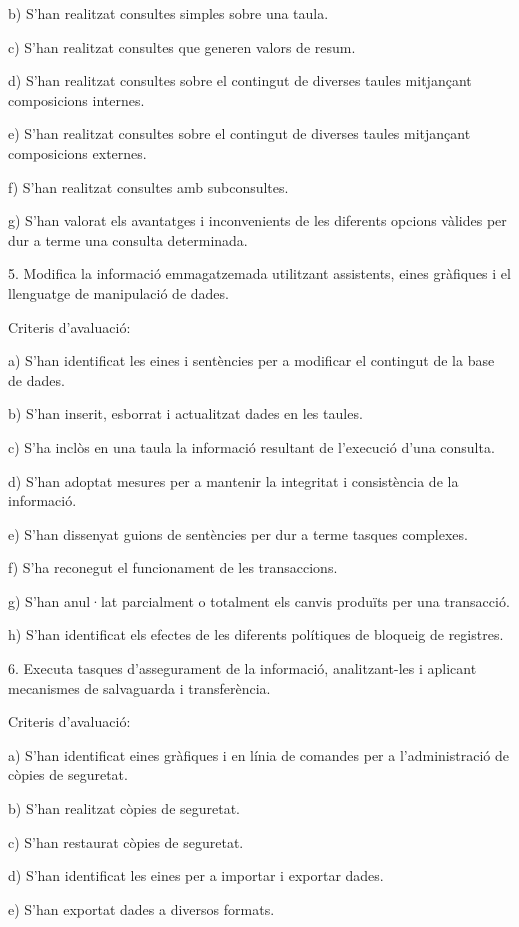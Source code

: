 \documentclass[catalan, a4paper, 12pt, titlepage]{article}
\begin{document}
b) S'han realitzat consultes simples sobre una taula.

c) S'han realitzat consultes que generen valors de resum.

d) S'han realitzat consultes sobre el contingut de diverses taules mitjançant composicions internes.

e) S'han realitzat consultes sobre el contingut de diverses taules mitjançant composicions externes.

f) S'han realitzat consultes amb subconsultes.

g) S'han valorat els avantatges i inconvenients de les diferents opcions vàlides per dur a terme una consulta determinada.

5. Modifica la informació emmagatzemada utilitzant assistents, eines gràfiques i el llenguatge de manipulació de dades.

Criteris d'avaluació:

a) S'han identificat les eines i sentències per a modificar el contingut de la base de dades.

b) S'han inserit, esborrat i actualitzat dades en les taules.

c) S'ha inclòs en una taula la informació resultant de l'execució d'una consulta.

d) S'han adoptat mesures per a mantenir la integritat i consistència de la informació.

e) S'han dissenyat guions de sentències per dur a terme tasques complexes.

f) S'ha reconegut el funcionament de les transaccions.

g) S'han anul·lat parcialment o totalment els canvis produïts per una transacció.

h) S'han identificat els efectes de les diferents polítiques de bloqueig de registres.

6. Executa tasques d'assegurament de la informació, analitzant-les i aplicant mecanismes de salvaguarda i transferència.

Criteris d'avaluació:

a) S'han identificat eines gràfiques i en línia de comandes per a l'administració de còpies de seguretat.

b) S'han realitzat còpies de seguretat.

c) S'han restaurat còpies de seguretat.

d) S'han identificat les eines per a importar i exportar dades.

e) S'han exportat dades a diversos formats.
\end{document}
